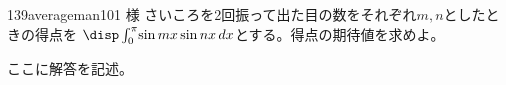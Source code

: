 \begin{thm}{139}{}{averageman101 様}
 さいころを2回振って出た目の数をそれぞれ$m, n$としたときの得点を $\disp \int_0^\pi\! \sin mx \sin nx \,dx$とする。得点の期待値を求めよ。
\end{thm}

ここに解答を記述。